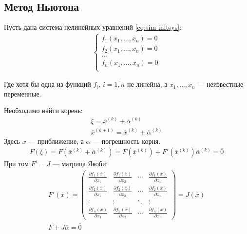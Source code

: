 \subsection{Метод Ньютона}
Пусть дана система нелинейных уравнений \cref{eq:sim-initsys}:
\begin{align*}
	\begin{cases}
		f_1(x_1,\dots,x_n) = 0 \\
		f_2(x_1,\dots,x_n) = 0 \\
		\dots                  \\
		f_n(x_1,\dots,x_n) = 0 \\
	\end{cases}
\end{align*}

Где хотя бы одна из функций \(f_i,\, i=\overline{1,n}\) не линейна, а \(x_1,\dots,x_n\) --- неизвестные переменные.

Необходимо найти корень:
\begin{align}
	\xi = \overline{x}^{(k)} + \overline{\alpha}^{(k)} \\
	\overline{x}^{(k+1)} = \overline{x}^{(k)} + \overline{\alpha}^{(k)} \label{eq:newthon-prealpha-next}
\end{align}
Здесь \(x\) --- приближение, а \(\alpha\) --- погрешность корня.
\begin{align}
	F(\xi) = F(\overline{x}^{(k)} + \overline{\alpha}^{(k)}) = F(\overline{x}^{(k)}) + F'(\overline{x}^{(k)})\overline{\alpha}^{(k)} = \overline{0}
\end{align}
При том \(F' = J\) --- матрица Якоби:
\begin{align}
	F'(\overline{x}) = \begin{pmatrix}
		                   \frac{\partial f_1(\overline{x})}{\partial x_1} & \frac{\partial f_1(\overline{x})}{\partial x_2} & \cdots                                          & \frac{\partial f_1(\overline{x})}{\partial x_n} \\
		                   \frac{\partial f_2(\overline{x})}{\partial x_1} & \frac{\partial f_2(\overline{x})}{\partial x_2} & \cdots                                          & \frac{\partial f_2(\overline{x})}{\partial x_n} \\
		                   \vdots                                          & \vdots                                          & \ddots                                          & \vdots                                          \\
		                   \frac{\partial f_n(\overline{x})}{\partial x_1} & \frac{\partial f_n(\overline{x})}{\partial x_2}
		                                                                   & \cdots                                          & \frac{\partial f_n(\overline{x})}{\partial x_n}
	                   \end{pmatrix} = J(\overline{x}) \\
	F + J\overline{\alpha} = \overline{0} \label{eq:pre-j}
\end{align}

